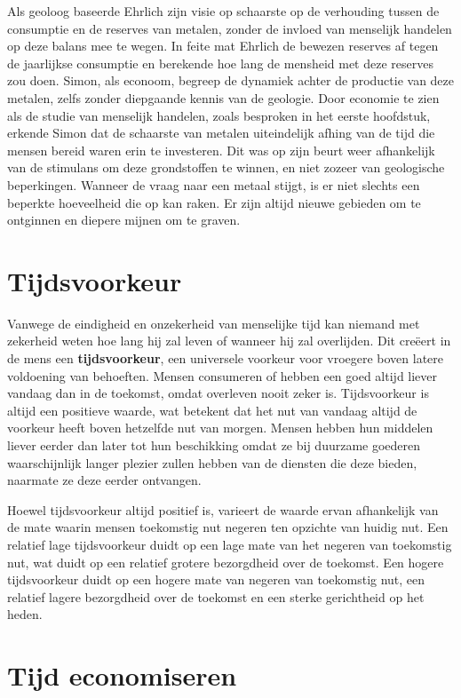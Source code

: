\documentclass[
  a5paper,
  smalldemyvopaper,11pt,twoside,onecolumn,openright,extrafontsizes,
hidelinks]{memoir}
\begin{document}
Als geoloog baseerde Ehrlich zijn visie op schaarste op de verhouding
tussen de consumptie en de reserves van metalen, zonder de invloed van
menselijk handelen op deze balans mee te wegen. In feite mat Ehrlich de
bewezen reserves af tegen de jaarlijkse consumptie en berekende hoe lang
de mensheid met deze reserves zou doen. Simon, als econoom, begreep de
dynamiek achter de productie van deze metalen, zelfs zonder diepgaande
kennis van de geologie. Door economie te zien als de studie van
menselijk handelen, zoals besproken in het eerste hoofdstuk, erkende
Simon dat de schaarste van metalen uiteindelijk afhing van de tijd die
mensen bereid waren erin te investeren. Dit was op zijn beurt weer
afhankelijk van de stimulans om deze grondstoffen te winnen, en niet
zozeer van geologische beperkingen. Wanneer de vraag naar een metaal
stijgt, is er niet slechts een beperkte hoeveelheid die op kan raken. Er
zijn altijd nieuwe gebieden om te ontginnen en diepere mijnen om te
graven.

\section{Tijdsvoorkeur}\label{tijdsvoorkeur}

Vanwege de eindigheid en onzekerheid van menselijke tijd kan niemand met
zekerheid weten hoe lang hij zal leven of wanneer hij zal overlijden.
Dit creëert in de mens een \textbf{tijdsvoorkeur}, een universele
voorkeur voor vroegere boven latere voldoening van behoeften. Mensen
consumeren of hebben een goed altijd liever vandaag dan in de toekomst,
omdat overleven nooit zeker is. Tijdsvoorkeur is altijd een positieve
waarde, wat betekent dat het nut van vandaag altijd de voorkeur heeft
boven hetzelfde nut van morgen. Mensen hebben hun middelen liever eerder
dan later tot hun beschikking omdat ze bij duurzame goederen
waarschijnlijk langer plezier zullen hebben van de diensten die deze
bieden, naarmate ze deze eerder ontvangen.

Hoewel tijdsvoorkeur altijd positief is, varieert de waarde ervan
afhankelijk van de mate waarin mensen toekomstig nut negeren ten
opzichte van huidig nut. Een relatief lage tijdsvoorkeur duidt op een
lage mate van het negeren van toekomstig nut, wat duidt op een relatief
grotere bezorgdheid over de toekomst. Een hogere tijdsvoorkeur duidt op
een hogere mate van negeren van toekomstig nut, een relatief lagere
bezorgdheid over de toekomst en een sterke gerichtheid op het heden.

\section{Tijd economiseren}\label{tijd-economiseren}
\end{document}
